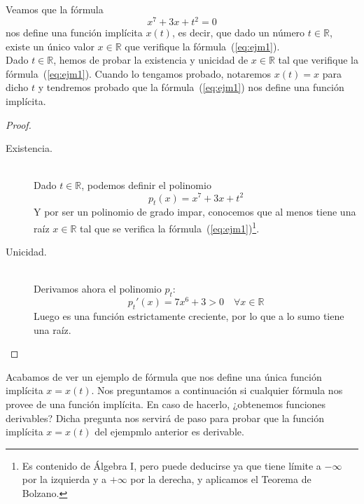 \begin{ejemplo}
    Veamos que la fórmula
    \begin{equation}\label{eq:ejm1}
        x^7+3x+t^2 = 0
    \end{equation}
    nos define una función implícita $x(t)$, es decir, que dado un número $t\in \mathbb{R}$, existe un único valor $x\in \mathbb{R}$ que verifique la fórmula~(\ref{eq:ejm1}).\\

    Dado $t\in \mathbb{R}$, hemos de probar la existencia y unicidad de $x\in \mathbb{R}$ tal que verifique la fórmula~(\ref{eq:ejm1}). Cuando lo tengamos probado, notaremos $x(t) = x$ para dicho $t$ y tendremos probado que la fórmula~(\ref{eq:ejm1}) nos define una función implícita.
    \begin{proof}~\\
        \begin{description}
            \item [Existencia.]~\\
                Dado $t\in \mathbb{R}$, podemos definir el polinomio
                \begin{equation*}
                    p_t(x) = x^7+3x+t^2
                \end{equation*}
                Y por ser un polinomio de grado impar, conocemos que al menos tiene una raíz $x\in \mathbb{R}$ tal que se verifica la fórmula~(\ref{eq:ejm1})\footnote{Es contenido de Álgebra I, pero puede deducirse ya que tiene límite a $-\infty$ por la izquierda y a $+\infty$ por la derecha, y aplicamos el Teorema de Bolzano.}.\\
            \item [Unicidad.]~\\
                Derivamos ahora el polinomio $p_t$:
                \begin{equation*}
                    p_t'(x) = 7x^6+3 > 0 \quad \forall x\in \mathbb{R}
                \end{equation*}
                Luego es una función estrictamente creciente, por lo que a lo sumo tiene una raíz.
        \end{description}
    \end{proof}
\end{ejemplo}

Acabamos de ver un ejemplo de fórmula que nos define una única función implícita $x=x(t)$.  Nos preguntamos a continuación si cualquier fórmula nos provee de una función implícita. En caso de hacerlo, ¿obtenemos funciones derivables? Dicha pregunta nos servirá de paso para probar que la función implícita $x=x(t)$ del ejempmlo anterior es derivable.\\

